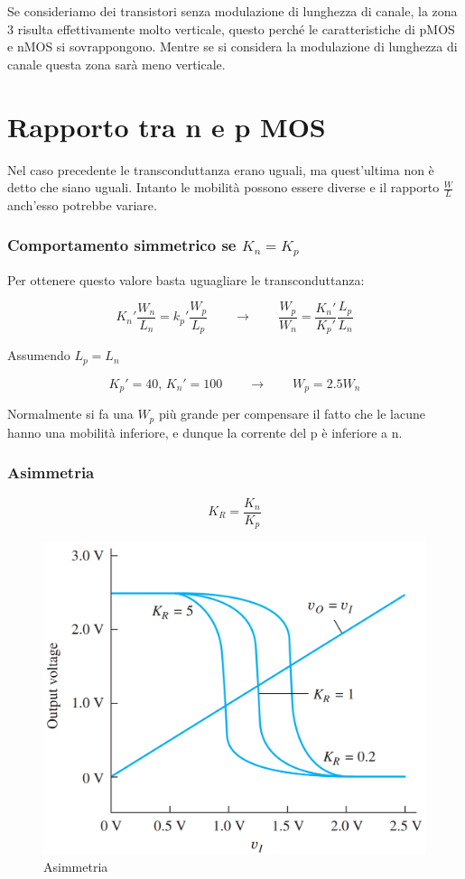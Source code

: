 Se consideriamo dei transistori senza modulazione di lunghezza di canale, la zona 3 risulta effettivamente molto verticale, questo perché le caratteristiche di pMOS e nMOS si sovrappongono. Mentre se si considera la modulazione di lunghezza di canale questa zona sarà meno verticale.


\newpage
\section{Rapporto tra n e p MOS}

Nel caso precedente le transconduttanza erano uguali, ma quest'ultima non è detto che siano uguali. Intanto le mobilità possono essere diverse e il rapporto $\frac{W}{L}$ anch'esso potrebbe variare.

\subsubsection{Comportamento simmetrico se $K_n = K_p$ }

Per ottenere questo valore basta uguagliare le transconduttanza:

\begin{equation*}
    K_n'\frac{W_n}{L_n} = k_p'\frac{W_p}{L_p} \qquad\to\qquad \frac{W_p}{W_n} = \frac{K_n'}{K_p'}\frac{L_p}{L_n}
\end{equation*}

Assumendo $L_p =L_n$

\begin{equation*}
    K_p' = 40,\, K_n' = 100 \qquad\to\qquad W_p = 2.5W_n
\end{equation*}

Normalmente si fa una $W_p$ più grande per compensare il fatto che le lacune hanno una mobilità inferiore, e dunque la corrente del p è inferiore a n.

\subsubsection{Asimmetria}

\begin{equation*}
    K_R = \frac{K_n}{K_p}
\end{equation*}

\begin{figure}[htbp]
    \centering
    \includegraphics[width=0.55\linewidth]{img/asimmetria.png}
    \caption{Asimmetria}    
\end{figure}

